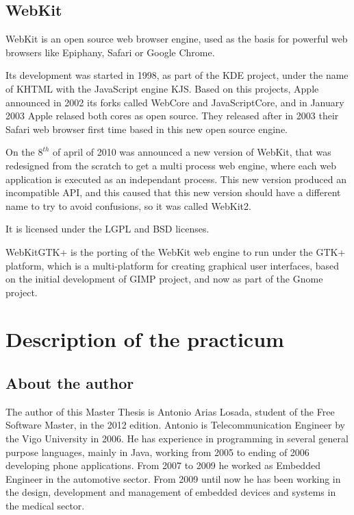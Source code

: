 \documentclass[a4paper,11pt,openany]{report}
\begin{document}
\section{WebKit}
WebKit\cite{webkit} is an open source web browser engine, used as the basis for powerful web browsers like Epiphany, Safari or Google Chrome.

Its development was started in 1998, as part of the KDE project, under the name of KHTML with the JavaScript engine KJS. Based on this projects, Apple announced in 2002 its forks called WebCore and JavaScriptCore, and in January 2003 Apple relased both cores as open source. They released after in 2003 their Safari web browser first time based in this new open source engine.

On the $8^{th}$ of april of 2010 was announced a new version of WebKit, that was redesigned from the scratch to get a multi process web engine, where each web application is executed as an independant process. This new version produced an incompatible API, and this caused that this new version should have a different name to try to avoid confusions, so it was called WebKit2.

It is licensed under the LGPL and BSD licenses.

WebKitGTK+\cite{webkitgtk+} is the porting of the WebKit web engine to run under the GTK+\cite{gtk+} platform, which is a multi-platform for creating graphical user interfaces, based on the initial development of GIMP\cite{gimp} project, and now as part of the Gnome\cite{gnome} project.

\chapter{Description of the practicum}

\section{About the author}
The author of this Master Thesis is Antonio Arias Losada, student of the Free Software Master, in the 2012 edition.
Antonio is Telecommunication Engineer by the Vigo University in 2006. He has experience in programming in several general purpose languages, mainly in Java, working from 2005 to ending of 2006 developing phone applications. From 2007 to 2009 he worked as Embedded Engineer in the automotive sector. From 2009 until now he has been working in the design, development and management of embedded devices and systems in the medical sector.
\end{document}
